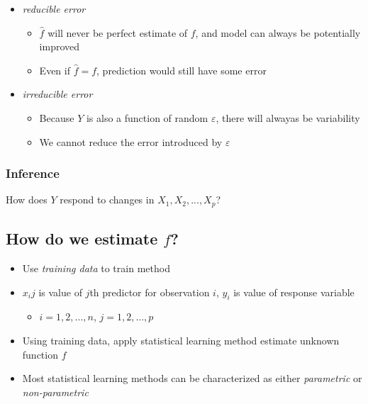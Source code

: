 \documentclass[]{book}
\providecommand{\tightlist}{%
  \setlength{\itemsep}{0pt}\setlength{\parskip}{0pt}}
\theoremstyle{definition}
\theoremstyle{definition}
\theoremstyle{definition}
\theoremstyle{remark}
\begin{document}
\begin{itemize}
\tightlist
\item
  \emph{reducible error}

  \begin{itemize}
  \tightlist
  \item
    \(\hat{f}\) will never be perfect estimate of \(f\), and model can
    always be potentially improved
  \item
    Even if \(\hat{f} = f\), prediction would still have some error
  \end{itemize}
\item
  \emph{irreducible error}

  \begin{itemize}
  \tightlist
  \item
    Because \(Y\) is also a function of random \(ε\), there will alwayas
    be variability
  \item
    We cannot reduce the error introduced by \(ε\)
  \end{itemize}
\end{itemize}

\subsubsection{Inference}\label{inference}

How does \(Y\) respond to changes in \(X_1, X_2, ..., X_p\)?

\subsection{\texorpdfstring{How do we estimate
\emph{\(f\)}?}{How do we estimate f?}}\label{how-do-we-estimate-f}

\begin{itemize}
\tightlist
\item
  Use \emph{training data} to train method
\item
  \(x_ij\) is value of \(j\)th predictor for observation \(i\), \(y_i\)
  is value of response variable

  \begin{itemize}
  \tightlist
  \item
    \(i = 1, 2, ..., n\), \(j = 1, 2, ..., p\)
  \end{itemize}
\item
  Using training data, apply statistical learning method estimate
  unknown function \(f\)
\item
  Most statistical learning methods can be characterized as either
  \emph{parametric} or \emph{non-parametric}
\end{itemize}
\end{document}

